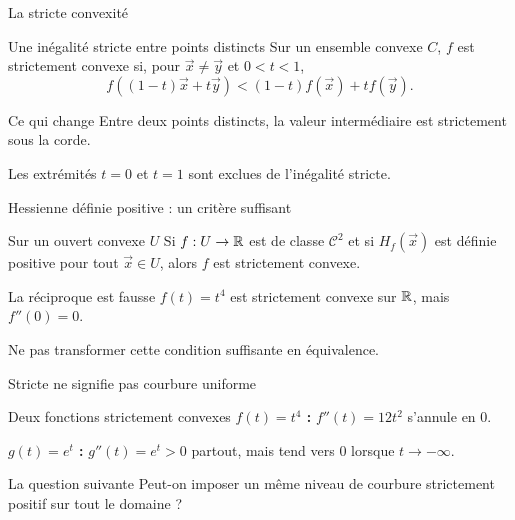 \begin{frame}[t]{La stricte convexité}
\coursanalyse
\begin{notion}{Une inégalité stricte entre points distincts}
Sur un ensemble convexe $C$, $f$ est strictement convexe si, pour $\vec x\ne\vec y$ et $0<t<1$,
\[f((1-t)\vec x+t\vec y)<(1-t)f(\vec x)+tf(\vec y).\]
\end{notion}
\begin{resultat}{Ce qui change}
Entre deux points distincts, la valeur intermédiaire est strictement sous la corde.
\end{resultat}
\vfill Les extrémités $t=0$ et $t=1$ sont exclues de l'inégalité stricte.
\end{frame}

\begin{frame}[t]{Hessienne définie positive : un critère suffisant}
\coursanalyse
\begin{theoreme}{Sur un ouvert convexe $U$}
Si $f:U\to\mathbb R$ est de classe $\mathcal C^2$ et si $H_f(\vec x)$ est définie positive pour tout $\vec x\in U$, alors $f$ est strictement convexe.
\end{theoreme}
\begin{exemple}{La réciproque est fausse}
$f(t)=t^4$ est strictement convexe sur $\mathbb R$, mais $f''(0)=0$.
\end{exemple}
\vfill Ne pas transformer cette condition suffisante en équivalence.
\end{frame}

\begin{frame}[t]{Stricte ne signifie pas courbure uniforme}
\coursanalyse
\begin{exemple}{Deux fonctions strictement convexes}
\textbf{$f(t)=t^4$ :} $f''(t)=12t^2$ s'annule en $0$.

\medskip
\textbf{$g(t)=e^t$ :} $g''(t)=e^t>0$ partout, mais tend vers $0$ lorsque $t\to-\infty$.
\end{exemple}
\begin{resultat}{La question suivante}
Peut-on imposer un même niveau de courbure strictement positif sur tout le domaine ?
\end{resultat}
\end{frame}

